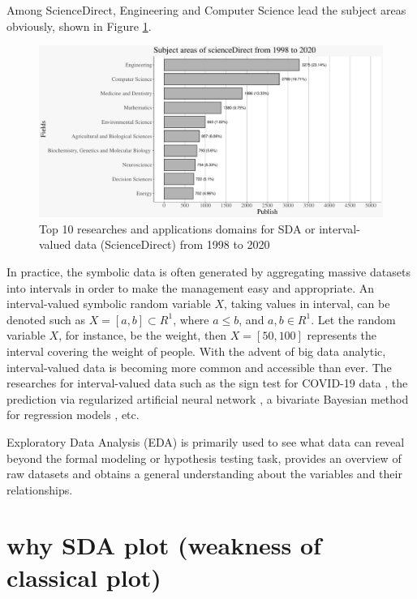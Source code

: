 \documentclass[article]{jss}
\newcommand{\imgdir}{../../../paperImage/}
\begin{document}
Among ScienceDirect, Engineering and Computer Science lead the subject areas obviously, shown in Figure \ref{fig:subjectAreas}.

\begin{figure}[htbp]	
  		\centering	 			 	 
\includegraphics{ggESDA_Jiang&Wu_20210915-subjectFig}
  		\caption{Top 10 researches and applications domains for SDA or interval-valued data (ScienceDirect) from 1998 to 2020} 
  		\label{fig:subjectAreas}   			 		 
\end{figure}


In practice, the symbolic data is often generated by aggregating massive datasets into intervals in order to make the management easy and appropriate. An interval-valued symbolic random variable $X$, taking values in interval, can be denoted such as $X = [a,b] \subset  R^{1}$, where $a \leq b$, and $a, b \in R^{1}$. Let the random variable $X$, for instance, be the weight, then $X = [50,100]$ represents the interval covering the weight of people. With the advent of big data analytic, interval-valued data is becoming more common and accessible than ever. The researches for interval-valued data such as the sign test for COVID-19 data \cite{sherwani:2021}, the prediction via regularized artificial neural network \cite{yang:2019}, a bivariate Bayesian method for regression models \cite{xu:2021}, etc.

Exploratory Data Analysis (EDA) \cite{Tukey:1977} is primarily used to see what data can reveal beyond the formal modeling or hypothesis testing task, provides an overview of raw datasets and obtains a general understanding about the variables and their relationships.


\section{why SDA plot (weakness of classical plot)}
\end{document}
